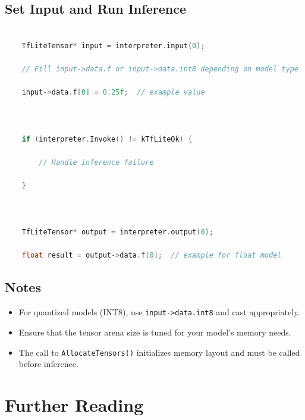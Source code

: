 \subsection{Set Input and Run Inference}



\begin{lstlisting}[language=C++, caption={Performing inference and accessing results}]

	TfLiteTensor* input = interpreter.input(0);

	// Fill input->data.f or input->data.int8 depending on model type

	input->data.f[0] = 0.25f;  // example value

	

	if (interpreter.Invoke() != kTfLiteOk) {

		// Handle inference failure

	}

	

	TfLiteTensor* output = interpreter.output(0);

	float result = output->data.f[0];  // example for float model

\end{lstlisting}



\subsection{Notes}



\begin{itemize}

	\item For quantized models (INT8), use \texttt{input->data.int8} and cast appropriately.

	\item Ensure that the tensor arena size is tuned for your model’s memory needs.

	\item The call to \texttt{AllocateTensors()} initializes memory layout and must be called before inference.

\end{itemize}



\cite{Google:2025}







\section{Further Reading}



